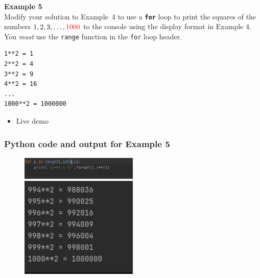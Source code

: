 \documentclass[english,14pt]{beamer}
\newcommand\red[1]{{\color{red} #1}}
\begin{document}
\begin{frame}[fragile]

\frametitle{}

\frametitle{}

\textbf{Example 5}\\
\vspace*{5mm}
Modify your solution to Example~4 to use a \textbf{\texttt{for}} loop to print the squares of the numbers $1, 2, 3, \ldots, \red{1000}$ to the console using the display format in Example 4. You \emph{must} use the \texttt{range} function in the \texttt{for} loop header.
\begin{verbatim}
1**2 = 1
2**2 = 4
3**2 = 9
4**2 = 16
...
1000**2 = 1000000
\end{verbatim}

\begin{itemize}
	\item Live demo
\end{itemize}
	
\end{frame}


\begin{frame}[fragile]

\frametitle{Python code and output for Example 5}

\begin{figure}[ht]
	\centering
	\includegraphics[width=0.5\textwidth]{figures/Week3ThuEx5a}\\
	\vspace*{5mm}
	\includegraphics[width=0.5\textwidth]{figures/Week3ThuEx5b}
\end{figure}

\end{frame}
\end{document}
